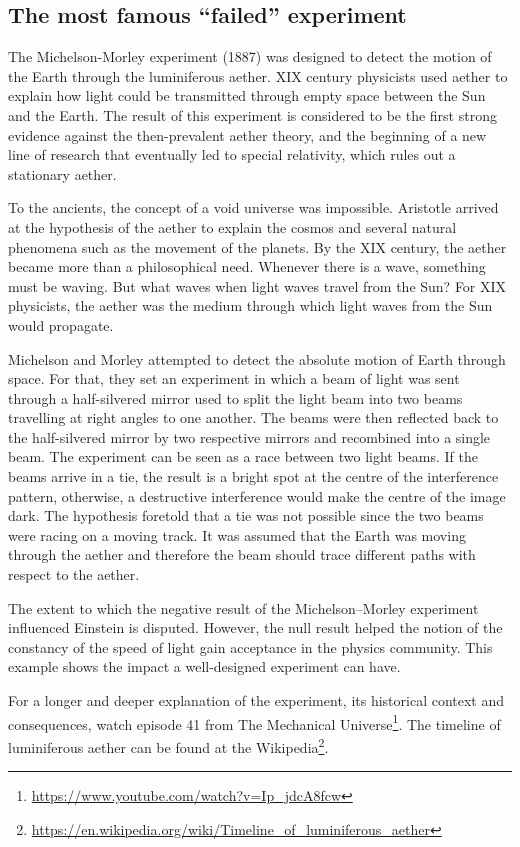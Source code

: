 \documentclass[
  12pt,
]{book}
\DeclareRobustCommand{\href}[2]{#2\footnote{\url{#1}}}
\begin{document}
\subsection{The most famous ``failed'' experiment}\label{michelson-morley}

The Michelson-Morley experiment (1887) was designed to detect the motion of the Earth through the luminiferous aether. XIX century physicists used aether to explain how light could be transmitted through empty space between the Sun and the Earth. The result of this experiment is considered to be the first strong evidence against the then-prevalent aether theory, and the beginning of a new line of research that eventually led to special relativity, which rules out a stationary aether.

To the ancients, the concept of a void universe was impossible. Aristotle arrived at the hypothesis of the aether to explain the cosmos and several natural phenomena such as the movement of the planets. By the XIX century, the aether became more than a philosophical need. Whenever there is a wave, something must be waving. But what waves when light waves travel from the Sun? For XIX physicists, the aether was the medium through which light waves from the Sun would propagate.

Michelson and Morley attempted to detect the absolute motion of Earth through space. For that, they set an experiment in which a beam of light was sent through a half-silvered mirror used to split the light beam into two beams travelling at right angles to one another. The beams were then reflected back to the half-silvered mirror by two respective mirrors and recombined into a single beam. The experiment can be seen as a race between two light beams. If the beams arrive in a tie, the result is a bright spot at the centre of the interference pattern, otherwise, a destructive interference would make the centre of the image dark. The hypothesis foretold that a tie was not possible since the two beams were racing on a moving track. It was assumed that the Earth was moving through the aether and therefore the beam should trace different paths with respect to the aether.

The extent to which the negative result of the Michelson--Morley experiment influenced Einstein is disputed. However, the null result helped the notion of the constancy of the speed of light gain acceptance in the physics community. This example shows the impact a well-designed experiment can have.

For a longer and deeper explanation of the experiment, its historical context and consequences, watch \href{https://www.youtube.com/watch?v=Ip_jdcA8fcw}{episode 41 from The Mechanical Universe}. The timeline of luminiferous aether can be found \href{https://en.wikipedia.org/wiki/Timeline_of_luminiferous_aether}{at the Wikipedia}.
\end{document}
